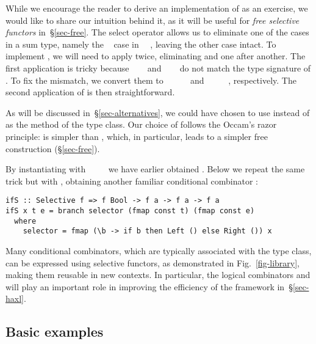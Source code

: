 \noindent
While we encourage the reader to derive an implementation of  as an
exercise, we would like to share our intuition behind it, as it will be useful
for \emph{free selective functors} in~\S\ref{sec-free}. The select operator
allows us to eliminate one of the cases in a sum type, namely the
~ case in ~~, leaving the other case
intact. To implement , we will need to apply  twice,
eliminating  and  one after another. The first application is tricky
because ~~~ and
~\hs{(}~\hs{->}~ do not match the type signature of .
To fix the mismatch, we convert them to
~~~\hs{(}~~ and
~\hs{(}~\hs{->}~~~, respectively. The second
application of  is then straightforward.

As will be discussed in~\S\ref{sec-alternatives}, we could have chosen to use
 instead of  as the method of the  type
class. Our choice of  follows the Occam's razor principle:
 is simpler than , which, in particular, leads to a
simpler free construction (\S\ref{sec-free}).

By instantiating  with ~\hs{=}~~\hs{=}~\hs{()} we have
earlier obtained . Below we repeat the same trick but with
, obtaining another familiar conditional combinator :

\vspace{1mm}
\begin{verbatim}
ifS :: Selective f => f Bool -> f a -> f a -> f a
ifS x t e = branch selector (fmap const t) (fmap const e)
  where
    selector = fmap (\b -> if b then Left () else Right ()) x
\end{verbatim}
\vspace{1mm}

\noindent
Many conditional combinators, which are typically associated with the 
type class, can be expressed using selective functors, as demonstrated in
Fig.~\ref{fig-library}, making them reusable in new contexts. In particular, the
logical combinators \hs{<||>} and \hs{<&&>} will play an important role in
improving the efficiency of the \Haxl framework in~\S\ref{sec-haxl}.

\subsection{Basic examples}\label{sec-instances}


